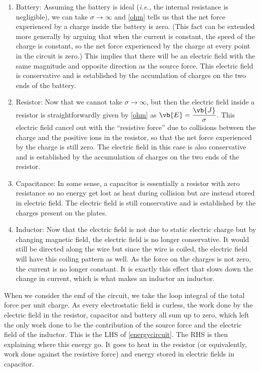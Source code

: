 \documentclass[english,a4paper,12pt]{report}
\begin{document}
\begin{enumerate}
    \item Battery: Assuming the battery is ideal (\textit{i.e.,} the internal resistance is negligible), we can take \(\sigma \rightarrow \infty\) and \cref{ohm} tells us that the net force experienced by a charge inside the battery is zero. (This fact can be extended more generally by arguing that when the current is constant, the speed of the charge is constant, so the net force experienced by the charge at every point in the circuit is zero.) This implies that there will be an electric field with the same magnitude and opposite direction as the source force. This electric field is conservative and is established by the accumlation of charges on the two ends of the battery.
    \item Resistor: Now that we cannot take \(\sigma \rightarrow \infty\), but then the electric field inside a resistor is straightforwardly given by \cref{ohm} as \(\displaystyle \vb{E} = \frac{\vb{J} }{\sigma } \). This electric field cancel out with the ``resistive force'' due to collisions between the charge and the positive ions in the resistor, so that the net force experienced by the charge is still zero. The electric field in this case is also conservative and is established by the accumulation of charges on the two ends of the resistor.
    \item Capacitance: In some sense, a capacitor is essentially a resistor with zero resistance so no energy get lost as heat during collision but are instead stored in electric field. The electric field is still conservative and is established by the charges present on the plates. 
    \item Inductor: Now that the electric field is not due to static electric charge but by changing magnetic field, the electric field is no longer conservative. It would still be directed along the wire but since the wire is coiled, the electric field will have this coiling pattern as well. As the force on the charges is not zero, the current is no longer constant. It is exactly this effect that slows down the change in current, which is what makes an inductor an inductor.
\end{enumerate}

When we consider the emf of the circuit, we take the loop integral of the total force per unit charge. As every electrostatic field is curless, the work done by the electric field in the resistor, capacitor and battery all sum up to zero, which left the only work done to be the contribution of the source force and the electric field of the inductor. This is the LHS of \cref{energycircuit}. The RHS is then explaining where this energy go. It goes to heat in the resistor (or equivalently, work done against the resistive force) and energy stored in electric fields in capacitor. 
\end{document}
